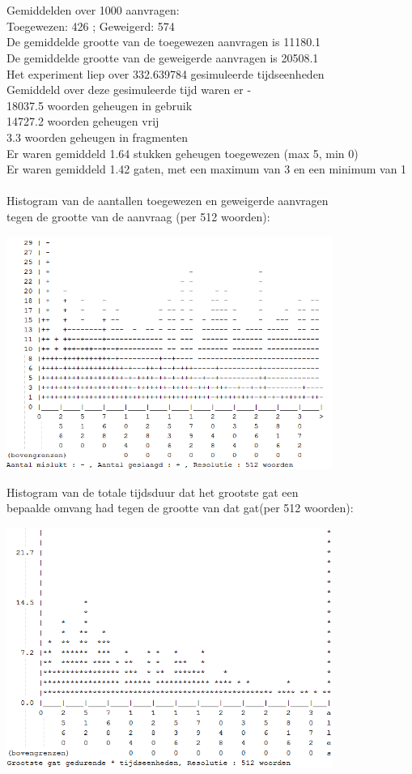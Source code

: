 \documentclass[a4paper]{article}
\begin{document}
			\\
			\\
			Gemiddelden over 1000 aanvragen:\\
			Toegewezen: 426 ; Geweigerd: 574\\
			De gemiddelde grootte van de toegewezen aanvragen is 11180.1\\
			De gemiddelde grootte van de geweigerde aanvragen is 20508.1\\
			Het experiment liep over 332.639784 gesimuleerde tijdseenheden\\
			Gemiddeld over deze gesimuleerde tijd waren er - \\
			 18037.5 woorden geheugen in gebruik\\
			 14727.2 woorden geheugen vrij\\
			     3.3 woorden geheugen in fragmenten\\
			Er waren gemiddeld     1.64 stukken geheugen toegewezen (max 5, min 0)\\
			Er waren gemiddeld     1.42 gaten, met een maximum van 3 en een minimum van 1\\
			\\
			Histogram van de aantallen toegewezen en geweigerde aanvragen\\
			tegen de grootte van de aanvraag (per 512 woorden):\\
			\begin{center}
				\includegraphics[width=0.8\textwidth]{ff1.png}
			\end{center}
			Histogram van de totale tijdsduur dat het grootste gat een\\
			bepaalde omvang had tegen de grootte van dat gat(per 512 woorden):
			\begin{center}
				\includegraphics[width=0.8\textwidth]{ff2.png}
			\end{center}
\end{document}
